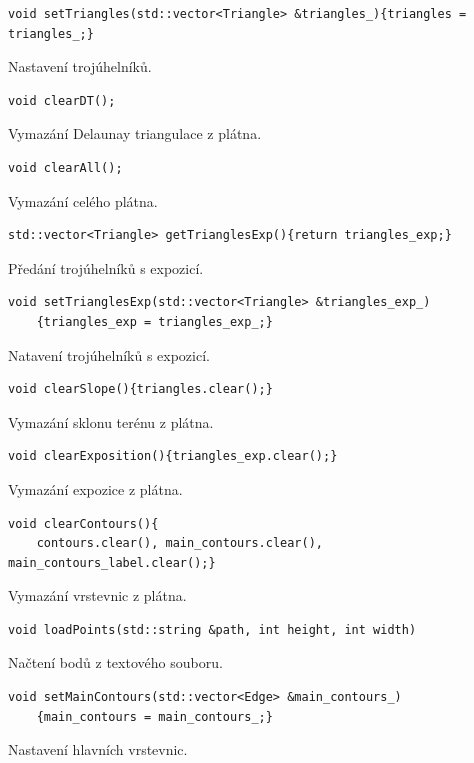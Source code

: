 \documentclass[a4paper, 12pt, oneside, titlepage]{article} %
\begin{document}
\begin{verbatim}
void setTriangles(std::vector<Triangle> &triangles_){triangles = triangles_;}
\end{verbatim}
Nastavení trojúhelníků.\\

\begin{verbatim}
void clearDT();
\end{verbatim}
Vymazání Delaunay triangulace z plátna.\\

\begin{verbatim}
void clearAll();
\end{verbatim}
Vymazání celého plátna.\\

\begin{verbatim}
std::vector<Triangle> getTrianglesExp(){return triangles_exp;}
\end{verbatim}
Předání trojúhelníků s expozicí.\\

\begin{verbatim}
void setTrianglesExp(std::vector<Triangle> &triangles_exp_)
    {triangles_exp = triangles_exp_;}
\end{verbatim}
Natavení trojúhelníků s expozicí.\\

\begin{verbatim}
void clearSlope(){triangles.clear();}
\end{verbatim}
Vymazání sklonu terénu z plátna.\\

\begin{verbatim}
void clearExposition(){triangles_exp.clear();}
\end{verbatim}
Vymazání expozice z plátna.\\

\begin{verbatim}
void clearContours(){
    contours.clear(), main_contours.clear(), main_contours_label.clear();}
\end{verbatim}
Vymazání vrstevnic z plátna.\\

\begin{verbatim}
void loadPoints(std::string &path, int height, int width)
\end{verbatim}
Načtení bodů z textového souboru.\\

\begin{verbatim}
void setMainContours(std::vector<Edge> &main_contours_)
    {main_contours = main_contours_;}
\end{verbatim}
Nastavení hlavních vrstevnic.\\
\end{document}
